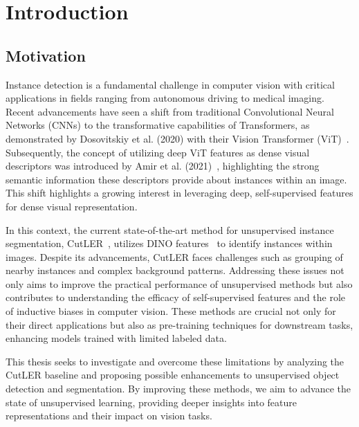 \chapter{Introduction}\label{chap:introduction}

\section{Motivation}
Instance detection is a fundamental challenge in computer vision with critical applications in fields ranging from autonomous driving to medical imaging. Recent advancements have seen a shift from traditional Convolutional Neural Networks (CNNs) to the transformative capabilities of Transformers, as demonstrated by Dosovitskiy et al. (2020) with their Vision Transformer (ViT)~\cite{dosovitskiy2020image}. Subsequently, the concept of utilizing deep ViT features as dense visual descriptors was introduced by Amir et al. (2021)~\cite{amir2021deep}, highlighting the strong semantic information these descriptors provide about instances within an image. This shift highlights a growing interest in leveraging deep, self-supervised features for dense visual representation.

In this context, the current state-of-the-art method for unsupervised instance segmentation, CutLER~\cite{wang2023cut}, utilizes DINO features~\cite{caron2021emerging} to identify instances within images. Despite its advancements, CutLER faces challenges such as grouping of nearby instances and complex background patterns. Addressing these issues not only aims to improve the practical performance of unsupervised methods but also contributes to understanding the efficacy of self-supervised features and the role of inductive biases in computer vision. These methods are crucial not only for their direct applications but also as pre-training techniques for downstream tasks, enhancing models trained with limited labeled data.

This thesis seeks to investigate and overcome these limitations by analyzing the CutLER baseline and proposing possible enhancements to unsupervised object detection and segmentation. By improving these methods, we aim to advance the state of unsupervised learning, providing deeper insights into feature representations and their impact on vision tasks.

